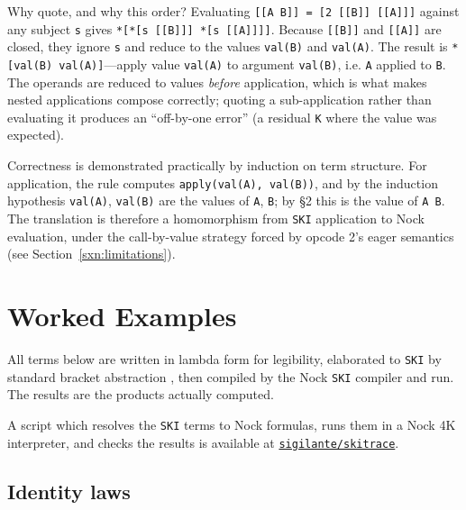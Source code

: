 \documentclass[twoside]{article}
\begin{document}
Why quote, and why this order?  Evaluating \lstinline[style=inlinecode]{[[A B]] = [2 [[B]] [[A]]]} against any subject \lstinline[style=inlinecode]{s} gives \lstinline[style=inlinecode]{*[*[s [[B]]] *[s [[A]]]]}. Because \lstinline[style=inlinecode]{[[B]]} and
\lstinline[style=inlinecode]{[[A]]} are closed, they ignore \lstinline[style=inlinecode]{s} and reduce to the values \lstinline[style=inlinecode]{val(B)} and
\lstinline[style=inlinecode]{val(A)}. The result is \lstinline[style=inlinecode]{*[val(B) val(A)]}---apply value \lstinline[style=inlinecode]{val(A)} to argument
\lstinline[style=inlinecode]{val(B)}, i.e. \lstinline[style=inlinecode]{A} applied to \lstinline[style=inlinecode]{B}. The operands are reduced to values \emph{before} application, which is what makes nested applications compose correctly; quoting a sub-application rather than evaluating it produces an ``off-by-one error'' (a residual \lstinline[style=inlinecode]{K} where the value was expected).

\sloppy
Correctness is demonstrated practically by induction on term structure.  For application, the rule computes \lstinline[style=inlinecode]{apply(val(A), val(B))}, and by the induction hypothesis \lstinline[style=inlinecode]{val(A)}, \lstinline[style=inlinecode]{val(B)} are the values of \lstinline[style=inlinecode]{A}, \lstinline[style=inlinecode]{B}; by §2 this is the value of \lstinline[style=inlinecode]{A B}. The translation is therefore a homomorphism from \texttt{SKI} application to Nock evaluation, under the call-by-value strategy forced by opcode 2's eager semantics (see Section~\ref{sxn:limitations}).

\section{Worked Examples}
\label{sxn:examples}

All terms below are written in lambda form for legibility, elaborated to \texttt{SKI} by standard bracket abstraction \citep{Kiselyov2018}, then compiled by the Nock \texttt{SKI} compiler and run.  The results are the products actually computed.

A script which resolves the \texttt{SKI} terms to Nock formulas, runs them in a Nock 4K interpreter, and checks the results is available at \href{https://github.com/sigilante/skitrace}{\texttt{sigilante/skitrace}}.

\subsection{Identity laws}
\end{document}
